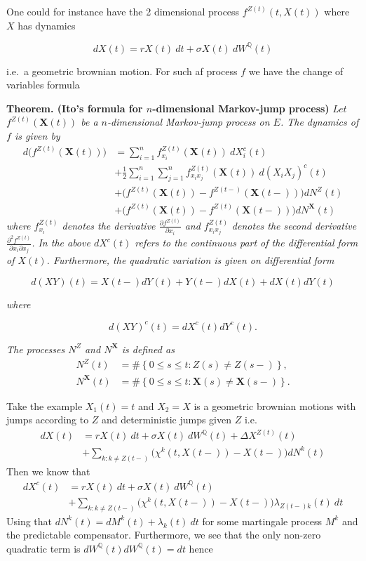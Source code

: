 \documentclass[a4paper,12pt,openany]{book}
\begin{document}
One could for instance have the 2 dimensional process \(f^{Z(t)}(t,X(t))\) where \(X\) has dynamics

\[
dX(t)=rX(t)\ dt + \sigma X(t)\ dW^\mathbb Q(t)
\]

i.e.~a geometric brownian motion. For such af process \(f\) we have the change of variables formula

\textbf{Theorem. (Ito's formula for \(n\)-dimensional Markov-jump process)} \emph{Let \(f^{Z(t)}(\mathbf X(t))\) be a \(n\)-dimensional Markov-jump process on \(E\). The dynamics of \(f\) is given by}
\begin{align*}
d \Big(f^{Z(t)}(\mathbf X(t))\Big)&=\sum_{i=1}^n f_{x_i}^{Z(t)}(\mathbf X(t))\ dX_i^c(t)\\
&+\frac{1}{2}\sum_{i=1}^n\sum_{j=1}^n f_{x_ix_j}^{Z(t)}(\mathbf X(t))\ d(X_iX_j)^c(t)\\
&+\Big(f^{Z(t)}(\mathbf X(t))-f^{Z(t-)}(\mathbf X(t-))\Big)dN^Z(t)\\
&+\Big(f^{Z(t)}(\mathbf X(t))-f^{Z(t)}(\mathbf X(t-))\Big)dN^\mathbf X(t)
\end{align*}
\emph{where \(f^{Z(t)}_{x_i}\) denotes the derivative \(\frac{\partial f^{Z(t)}}{\partial x_i}\) and \(f^{Z(t)}_{x_ix_j}\) denotes the second derivative \(\frac{\partial^2 f^{Z(t)}}{\partial x_i\partial x_j}\). In the above \(dX^c(t)\) refers to the continuous part of the differential form of \(X(t)\). Furthermore, the quadratic variation is given on differential form}

\[
d(XY)(t)=X(t-)dY(t)+Y(t-)dX(t)+dX(t)dY(t)
\]

\emph{where}

\[
d(XY)^c(t)=dX^c(t)dY^c(t).
\]

\emph{The processes \(N^Z\) and \(N^\mathbf X\) is defined as}
\begin{align*}
N^Z(t)&=\#\left\{ 0\le s\le t: Z(s)\ne Z(s-) \right\},\\
N^\mathbf X(t)&=\#\left\{ 0\le s\le t: \mathbf X(s)\ne \mathbf X(s-) \right\}.
\end{align*}

Take the example \(X_1(t)=t\) and \(X_2=X\) is a geometric brownian motions with jumps according to \(Z\) and deterministic jumps given \(Z\) i.e.
\begin{align*}
dX(t)&=rX(t)\ dt+\sigma X(t)\ dW^\mathbb Q(t)+\Delta X^{Z(t)}(t)\\
&+\sum_{k:k\ne Z(t-)}\Big(\chi^k(t,X(t-))-X(t-)\Big)dN^{k}(t)
\end{align*}
Then we know that
\begin{align*}
dX^c(t)&=rX(t)\ dt+\sigma X(t)\ dW^\mathbb Q(t)\\
&+\sum_{k:k\ne Z(t-)}\Big(\chi^k(t,X(t-))-X(t-)\Big)\lambda_{Z(t-)k}(t)\ dt
\end{align*}
Using that \(dN^k(t)=dM^k(t)+\lambda_k(t)\ dt\) for some martingale process \(M^k\) and the predictable compensator. Furthermore, we see that the only non-zero quadratic term is \(dW^\mathbb Q(t)dW^\mathbb Q(t)=dt\) hence
\end{document}
